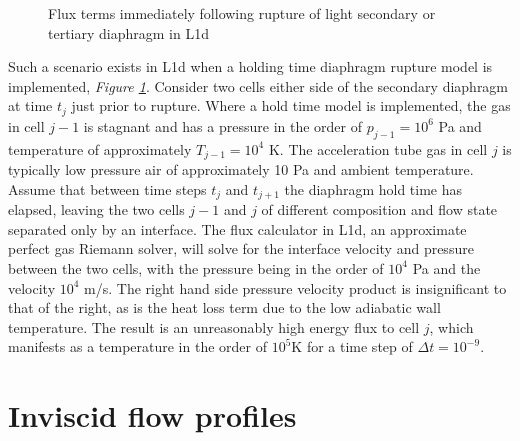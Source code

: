 \documentclass[a4paper,10pt]{article}
\begin{document}
\begin{figure}[hbt]
\centering
\centerline{}
\caption{Flux terms immediately following rupture of light secondary or tertiary diaphragm in L1d} \label{1ld_diaphragm}
\end{figure}

\par

Such a scenario exists in L1d when a holding time diaphragm rupture model is implemented, \emph{Figure \ref{1ld_diaphragm}}.  Consider two cells either side of the secondary diaphragm at time $t_{j}$ just prior to rupture.  Where a hold time model is implemented, the gas in cell $j-1$ is stagnant and has a pressure in the order of $p_{j-1} = 10^{6}$ Pa and temperature of approximately $T_{j-1} = 10^{4}$ K.  The acceleration tube gas in cell $j$ is typically low pressure air of approximately 10 Pa and ambient temperature.  Assume that between time steps $t_{j}$ and $t_{j+1}$ the diaphragm hold time has elapsed, leaving the two cells $j-1$ and $j$ of different composition and flow state separated only by an interface.  The flux calculator in L1d, an approximate perfect gas Riemann solver, will solve for the interface velocity and pressure between the two cells, with the pressure being in the order of $10^4$ Pa and the velocity $10^4$ m/s.  The right hand side pressure velocity product is insignificant to that of the right, as is the heat loss term due to the low adiabatic wall temperature. The result is an unreasonably high energy flux to cell $j$, which manifests as a temperature in the order of $10^5$K for a time step of $\Delta t = 10^{-9} $.

\section{Inviscid flow profiles}
\label{appendix_B}
\end{document}
